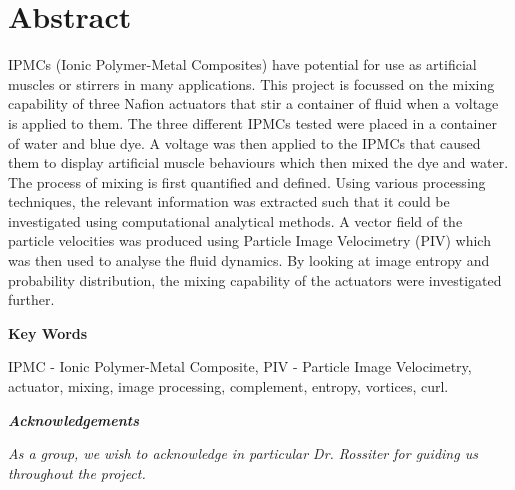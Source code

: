 
\section{Abstract}

IPMCs (Ionic Polymer-Metal Composites) have potential for use as artificial muscles or stirrers in many applications. This project is focussed on the mixing capability of three Nafion actuators that stir a container of fluid when a voltage is applied to them. The three different IPMCs tested were placed in a container of water and blue dye. A voltage was then applied to the IPMCs that caused them to display artificial muscle behaviours which then mixed the dye and water. The process of mixing is first quantified and defined. Using various processing techniques, the relevant information was extracted such that it could be investigated using computational analytical methods. A vector field of the particle velocities was produced using Particle Image Velocimetry (PIV) which was then used to analyse the fluid dynamics. By looking at image entropy and probability distribution, the mixing capability of the actuators were investigated further.


\vspace{0.5cm}

\textbf{Key Words}

\bigbreak

IPMC - Ionic Polymer-Metal Composite, PIV - Particle Image Velocimetry,  actuator, mixing, image processing, complement, entropy, vortices, curl.

\vspace{0.5cm}

\textbf{\textit{Acknowledgements}}

\bigbreak

\textit{As a group, we wish to acknowledge in particular Dr. Rossiter for guiding us throughout the project.}